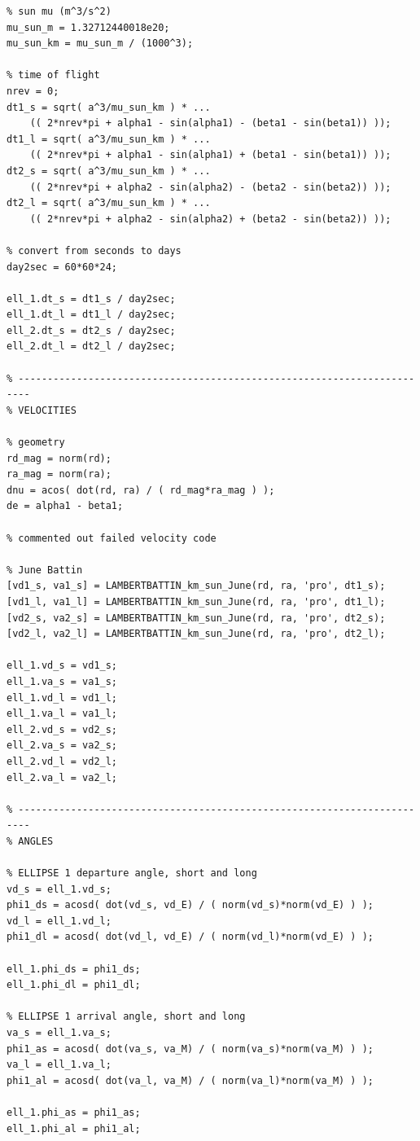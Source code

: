 \documentclass[conf]{new-aiaa}
\begin{document}
\begin{lstlisting}
% sun mu (m^3/s^2)
mu_sun_m = 1.32712440018e20; 
mu_sun_km = mu_sun_m / (1000^3); 

% time of flight 
nrev = 0; 
dt1_s = sqrt( a^3/mu_sun_km ) * ... 
    (( 2*nrev*pi + alpha1 - sin(alpha1) - (beta1 - sin(beta1)) )); 
dt1_l = sqrt( a^3/mu_sun_km ) * ... 
    (( 2*nrev*pi + alpha1 - sin(alpha1) + (beta1 - sin(beta1)) )); 
dt2_s = sqrt( a^3/mu_sun_km ) * ... 
    (( 2*nrev*pi + alpha2 - sin(alpha2) - (beta2 - sin(beta2)) )); 
dt2_l = sqrt( a^3/mu_sun_km ) * ... 
    (( 2*nrev*pi + alpha2 - sin(alpha2) + (beta2 - sin(beta2)) )); 

% convert from seconds to days 
day2sec = 60*60*24; 

ell_1.dt_s = dt1_s / day2sec; 
ell_1.dt_l = dt1_l / day2sec; 
ell_2.dt_s = dt2_s / day2sec; 
ell_2.dt_l = dt2_l / day2sec; 

% ------------------------------------------------------------------------
% VELOCITIES 

% geometry 
rd_mag = norm(rd); 
ra_mag = norm(ra); 
dnu = acos( dot(rd, ra) / ( rd_mag*ra_mag ) ); 
de = alpha1 - beta1; 

% commented out failed velocity code 

% June Battin 
[vd1_s, va1_s] = LAMBERTBATTIN_km_sun_June(rd, ra, 'pro', dt1_s); 
[vd1_l, va1_l] = LAMBERTBATTIN_km_sun_June(rd, ra, 'pro', dt1_l); 
[vd2_s, va2_s] = LAMBERTBATTIN_km_sun_June(rd, ra, 'pro', dt2_s); 
[vd2_l, va2_l] = LAMBERTBATTIN_km_sun_June(rd, ra, 'pro', dt2_l); 

ell_1.vd_s = vd1_s; 
ell_1.va_s = va1_s; 
ell_1.vd_l = vd1_l; 
ell_1.va_l = va1_l; 
ell_2.vd_s = vd2_s; 
ell_2.va_s = va2_s; 
ell_2.vd_l = vd2_l; 
ell_2.va_l = va2_l; 

% ------------------------------------------------------------------------
% ANGLES 
    
% ELLIPSE 1 departure angle, short and long  
vd_s = ell_1.vd_s; 
phi1_ds = acosd( dot(vd_s, vd_E) / ( norm(vd_s)*norm(vd_E) ) ); 
vd_l = ell_1.vd_l; 
phi1_dl = acosd( dot(vd_l, vd_E) / ( norm(vd_l)*norm(vd_E) ) ); 

ell_1.phi_ds = phi1_ds; 
ell_1.phi_dl = phi1_dl; 

% ELLIPSE 1 arrival angle, short and long  
va_s = ell_1.va_s; 
phi1_as = acosd( dot(va_s, va_M) / ( norm(va_s)*norm(va_M) ) ); 
va_l = ell_1.va_l; 
phi1_al = acosd( dot(va_l, va_M) / ( norm(va_l)*norm(va_M) ) ); 

ell_1.phi_as = phi1_as; 
ell_1.phi_al = phi1_al; 


\end{lstlisting}
\end{document}
